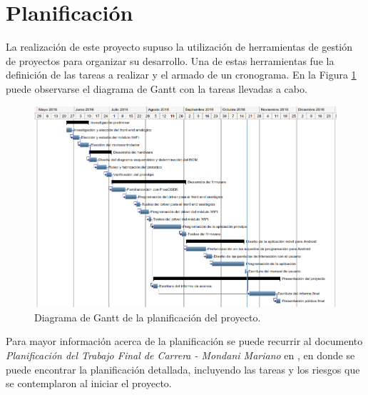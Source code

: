 \section{Planificación}

La realización de este proyecto supuso la utilización de herramientas de gestión de proyectos para organizar su desarrollo. Una de estas herramientas fue la definición de las tareas a realizar y el armado de un cronograma. En la Figura \ref{fig:diagrama_gantt} puede observarse el diagrama de Gantt con la tareas llevadas a cabo.

\begin{figure}[!h]
	\centering
	\includegraphics[width=18cm, angle=90]{./Figures/2_3_diagrama-Gantt.png}
	\caption{Diagrama de Gantt de la planificación del proyecto.}
	\label{fig:diagrama_gantt}
\end{figure}


Para mayor información acerca de la planificación se puede recurrir al documento \textit{Planificación del Trabajo Final de Carrera - Mondani Mariano} en \citep{repo_planificacion}, en donde se puede encontrar la planificación detallada, incluyendo las tareas y los riesgos que se contemplaron al iniciar el proyecto.
